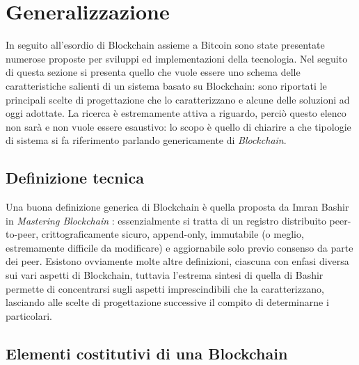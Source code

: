 \section{Generalizzazione}
	In seguito all'esordio di Blockchain assieme a Bitcoin sono state presentate numerose proposte per sviluppi ed implementazioni della tecnologia. Nel seguito di questa sezione si presenta quello che vuole essere uno schema delle caratteristiche salienti di un sistema basato su Blockchain: sono riportati le principali scelte di progettazione che lo caratterizzano e alcune delle soluzioni ad oggi adottate. La ricerca è estremamente attiva a riguardo, perciò questo elenco non sarà e non vuole essere esaustivo: lo scopo è quello di chiarire a che tipologie di sistema si fa riferimento parlando genericamente di \emph{Blockchain}.
	\subsection{Definizione tecnica}
		Una buona definizione generica di Blockchain è quella proposta da Imran Bashir in \emph{Mastering Blockchain} \cite{mastering_blockchain}: essenzialmente si tratta di un registro distribuito peer-to-peer, crittograficamente sicuro, append-only, immutabile (o meglio, estremamente difficile da modificare) e aggiornabile solo previo consenso da parte dei peer. Esistono ovviamente molte altre definizioni, ciascuna con enfasi diversa sui vari aspetti di Blockchain, tuttavia l'estrema sintesi di quella di Bashir permette di concentrarsi sugli aspetti imprescindibili che la caratterizzano, lasciando alle scelte di progettazione successive il compito di determinarne i particolari.
	
	\subsection{Elementi costitutivi di una Blockchain}
